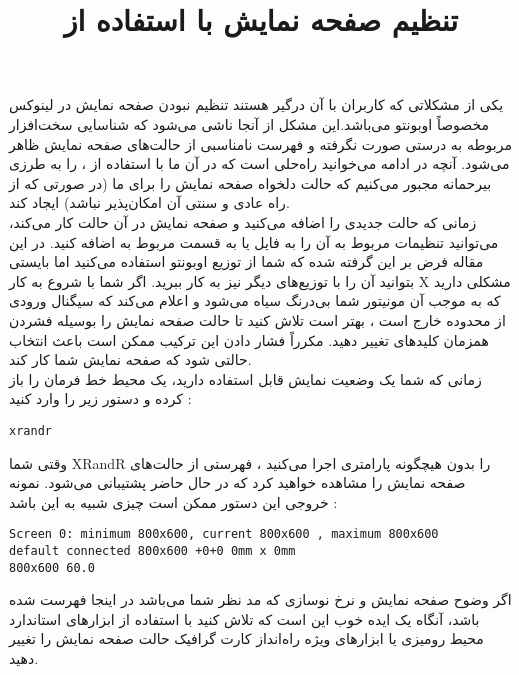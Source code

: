\documentclass[a4paper,12pt]{article}
\title{تنظیم صفحه نمایش با استفاده از \lr{XRandR}}
\begin{document}
\maketitle
\newpage
\begin{center}
\end{center}
یکی از مشکلاتی که کاربران با آن درگیر هستند تنظیم نبودن صفحه نمایش در لینوکس مخصوصاً اوبونتو می‌باشد.این مشکل از آنجا ناشی می‌شود که شناسایی سخت‌افزار مربوطه به درستی صورت نگرفته و فهرست نامناسبی از حالت‌های صفحه نمایش ظاهر می‌شود. آنچه در ادامه می‌خوانید راه‌حلی است که در آن ما با استفاده از ،  را به طرزی بیرحمانه مجبور می‌کنیم که حالت دلخواه صفحه نمایش را برای ما (در صورتی که از راه عادی و سنتی آن امکان‌پذیر نباشد) ایجاد کند.\\
زمانی که حالت جدیدی را اضافه می‌کنید و صفحه نمایش در آن حالت کار می‌کند، می‌توانید تنظیمات مربوط به آن را به فایل  یا  به قسمت  مربوط به   اضافه کنید. در این مقاله فرض بر این گرفته شده  که شما از توزیع اوبونتو استفاده می‌کنید اما بایستی بتوانید آن را با  توزیع‌های دیگر نیز به کار ببرید.
اگر شما با شروع به کار X مشکلی دارید که به موجب آن مونیتور شما بی‌درنگ سیاه می‌شود و اعلام می‌کند که سیگنال ورودی از محدوده خارج است ، بهتر است تلاش کنید تا  حالت صفحه نمایش را بوسیله فشردن همزمان کلیدهای  تغییر دهید. مکرراً فشار دادن این ترکیب  ممکن است  باعث انتخاب حالتی شود که صفحه نمایش شما کار کند.\\
زمانی که شما یک وضعیت نمایش قابل استفاده دارید، یک محیط خط فرمان را باز کرده و دستور زیر را وارد کنید :
\begin{LTR}
\begin{Verbatim}[frame=single,formatcom=\color{magenta}]
xrandr
\end{Verbatim}
\end{LTR}
وقتی شما XRandR  را بدون هیچگونه پارامتری اجرا می‌کنید ، فهرستی از حالت‌های صفحه نمایش را مشاهده خواهید کرد که در حال حاضر پشتیبانی می‌شود. نمونه خروجی این دستور ممکن است چیزی شبیه به این باشد :
\begin{LTR}
\begin{Verbatim}[frame=single,formatcom=\color{cyan}]
Screen 0: minimum 800x600, current 800x600 , maximum 800x600
default connected 800x600 +0+0 0mm x 0mm
800x600 60.0
\end{Verbatim}
\end{LTR}
اگر وضوح صفحه نمایش و نرخ نوسازی که مد نظر  شما می‌باشد در اینجا فهرست شده باشد، آنگاه یک ایده خوب این است که تلاش کنید با استفاده از ابزارهای استاندارد محیط رومیزی یا ابزارهای ویژه راه‌انداز کارت گرافیک حالت صفحه نمایش را تغییر دهید.\\
\end{document}
